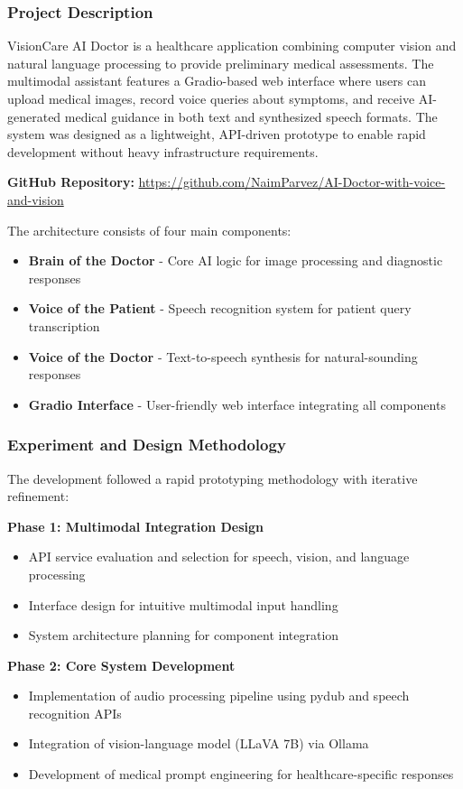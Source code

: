 \documentclass[12pt,a4paper]{article}
\begin{document}
\subsubsection{Project Description}
VisionCare AI Doctor is a healthcare application combining computer vision and natural language processing to provide preliminary medical assessments. The multimodal assistant features a Gradio-based web interface where users can upload medical images, record voice queries about symptoms, and receive AI-generated medical guidance in both text and synthesized speech formats. The system was designed as a lightweight, API-driven prototype to enable rapid development without heavy infrastructure requirements.

\textbf{GitHub Repository:} \url{https://github.com/NaimParvez/AI-Doctor-with-voice-and-vision}

The architecture consists of four main components:
\begin{itemize}
    \item \textbf{Brain of the Doctor} - Core AI logic for image processing and diagnostic responses
    \item \textbf{Voice of the Patient} - Speech recognition system for patient query transcription
    \item \textbf{Voice of the Doctor} - Text-to-speech synthesis for natural-sounding responses
    \item \textbf{Gradio Interface} - User-friendly web interface integrating all components
\end{itemize}

\subsubsection{Experiment and Design Methodology}
The development followed a rapid prototyping methodology with iterative refinement:

\textbf{Phase 1: Multimodal Integration Design}
\begin{itemize}
    \item API service evaluation and selection for speech, vision, and language processing
    \item Interface design for intuitive multimodal input handling
    \item System architecture planning for component integration
\end{itemize}

\textbf{Phase 2: Core System Development}
\begin{itemize}
    \item Implementation of audio processing pipeline using pydub and speech recognition APIs
    \item Integration of vision-language model (LLaVA 7B) via Ollama
    \item Development of medical prompt engineering for healthcare-specific responses
\end{itemize}
\end{document}
